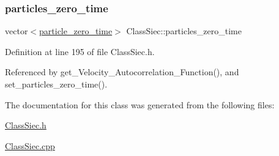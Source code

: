 \subsubsection{\texorpdfstring{particles\+\_\+zero\+\_\+time}{particles\_zero\_time}}
{\footnotesize\ttfamily vector$<$\mbox{\hyperlink{structparticle__zero__time}{particle\+\_\+zero\+\_\+time}}$>$ Class\+Siec\+::particles\+\_\+zero\+\_\+time}



Definition at line 195 of file Class\+Siec.\+h.



Referenced by get\+\_\+\+Velocity\+\_\+\+Autocorrelation\+\_\+\+Function(), and set\+\_\+particles\+\_\+zero\+\_\+time().



The documentation for this class was generated from the following files\+:\begin{DoxyCompactItemize}
\item 
\mbox{\hyperlink{ClassSiec_8h}{Class\+Siec.\+h}}\item 
\mbox{\hyperlink{ClassSiec_8cpp}{Class\+Siec.\+cpp}}\end{DoxyCompactItemize}

